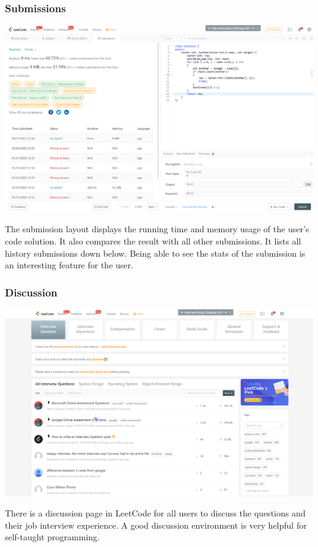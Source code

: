 \documentclass[a4paper]{report}
\begin{document}
\subsubsection{Submissions}

\includegraphics[width=\linewidth]{Two-Sum-LeetCode-Submission}

The submission layout displays the running time and memory usage of the user's code solution. It also compares the result with all other submissions. It lists all history submissions down below. Being able to see the stats of the submission is an interesting feature for the user.

\subsubsection{Discussion}

\includegraphics[width=\linewidth]{nterview-Question-LeetCode-Discuss}

There is a discussion page in LeetCode for all users to discuss the questions and their job interview experience. A good discussion environment is very helpful for self-taught programming.
\end{document}
